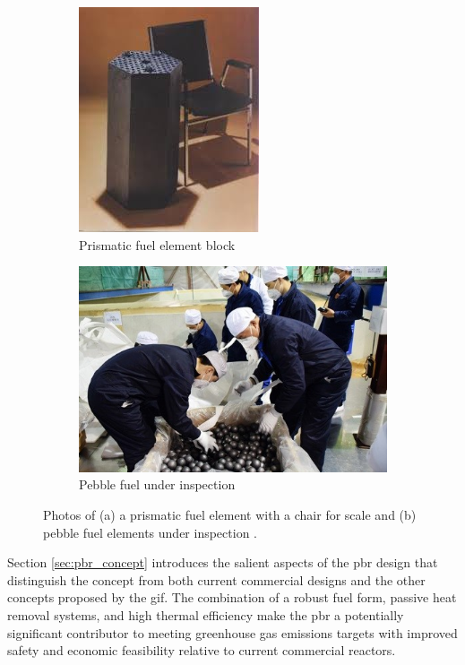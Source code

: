 \begin{figure}[!h]
\centering
\begin{subfigure}{.485\textwidth}
  \centering
  \includegraphics[height=0.6\linewidth]{figs/prismatic.jpeg}
  \caption{Prismatic fuel element block}
  \label{fig:fuela}
\end{subfigure}
\begin{subfigure}{.485\textwidth}
  \centering
  \includegraphics[height=0.6\linewidth]{figs/htr_inspection.jpg}
  \caption{Pebble fuel under inspection}
  \label{fig:fuelb}
\end{subfigure}
\caption{Photos of (a) a prismatic fuel element with a chair for scale \cite{ge_fuel} and (b) pebble fuel elements under inspection \cite{htrpm_fuel}.}
\label{fig:fuel}
\end{figure}

Section \ref{sec:pbr_concept} introduces the salient aspects of the \gls{pbr} design that distinguish the concept from both current commercial designs and the other concepts proposed by the \gls{gif}. The combination of a robust fuel form, passive heat removal systems, and high thermal efficiency make the \gls{pbr} a potentially significant contributor to meeting greenhouse gas emissions targets with improved safety and economic feasibility relative to current commercial reactors.

